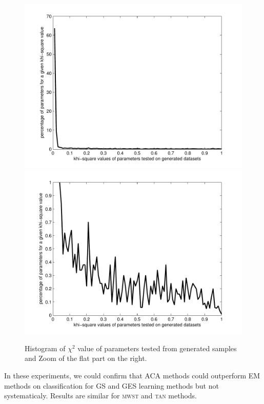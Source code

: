 \begin{figure}[!b]
\hspace*{20mm}\vspace*{-\baselineskip}
\includegraphics[scale=0.40]{fig/X21}
\includegraphics[scale=0.38]{fig/X22}
\caption{Histogram of $\chi^2$ value of parameters tested from
  generated samples and Zoom of the flat part on the right.\label{X21}}
\end{figure}

In these experiments, we could confirm that ACA methods could outperform EM methods on classification for \textsc{GS} and \textsc{GES} learning methods but not systematicaly.
Results are similar for \textsc{mwst} and \textsc{tan} methods.

